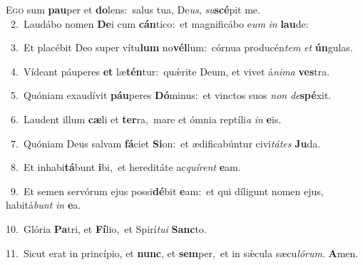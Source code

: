 \lettrine{\initial\textcolor{\initialcolor}{E}}{go} sum \textbf{pau}\-per et \textbf{do}\-lens:~\star salus tua, De\-\textit{us}\-, \textit{su}\-\textbf{scé}pit me.\\
{\numbfont\textcolor{\numbcolor}{~2.}}~Laudábo nomen \textbf{De}\-i cum \textbf{cán}\-tico:~\star et magnificábo e\textit{um} \textit{in} \textbf{lau}\-de:\par
{\numbfont\textcolor{\numbcolor}{~3.}}~Et placébit Deo super vítu\textbf{lum} no\-\textbf{vél}\-lum:~\star córnua producén\textit{tem} \textit{et} \textbf{ún}\-gulas.\par
{\numbfont\textcolor{\numbcolor}{~4.}}~Vídeant páuperes \textbf{et} læ\-\textbf{tén}\-tur:~\star quǽrite Deum, et vivet á\-\textit{ni}\-\textit{ma} \textbf{ves}\-tra.\par
{\numbfont\textcolor{\numbcolor}{~5.}}~Quóniam exaudívit \textbf{páu}\-peres \textbf{Dó}\-minus:~\star et vinctos suos \textit{non} \textit{de}\-\textbf{spé}xit.\par
{\numbfont\textcolor{\numbcolor}{~6.}}~Laudent illum \textbf{cæ}\-li et \textbf{ter}\-ra,~\star mare et ómnia reptíli\textit{a} \textit{in} \textbf{e}\-is.\par
{\numbfont\textcolor{\numbcolor}{~7.}}~Quóniam Deus salvam \textbf{fá}\-ciet \textbf{Si}\-on:~\star et ædificabúntur civi\-\textit{tá}\-\textit{tes} \textbf{Ju}\-da.\par
{\numbfont\textcolor{\numbcolor}{~8.}}~Et inhabi\-\textbf{tá}\-bunt \textbf{i}\-bi,~\star et hereditáte ac\-\textit{quí}\-\textit{rent} \textbf{e}\-am.\par
{\numbfont\textcolor{\numbcolor}{~9.}}~Et semen servórum ejus possi\-\textbf{dé}\-bit \textbf{e}\-am:~\star et qui díligunt nomen ejus, habitá\textit{bunt} \textit{in} \textbf{e}\-a.\par
{\numbfont\textcolor{\numbcolor}{10.}}~Glória \textbf{Pa}\-tri, et \textbf{Fí}\-lio,~\star et Spirí\-\textit{tu}\-\textit{i} \textbf{Sanc}\-to.\par
{\numbfont\textcolor{\numbcolor}{11.}}~Sicut erat in princípio, et \textbf{nunc}\-, et \textbf{sem}\-per,~\star et in sǽcula sæcu\-\textit{ló}\-\textit{rum}. \textbf{A}\-men.\par
